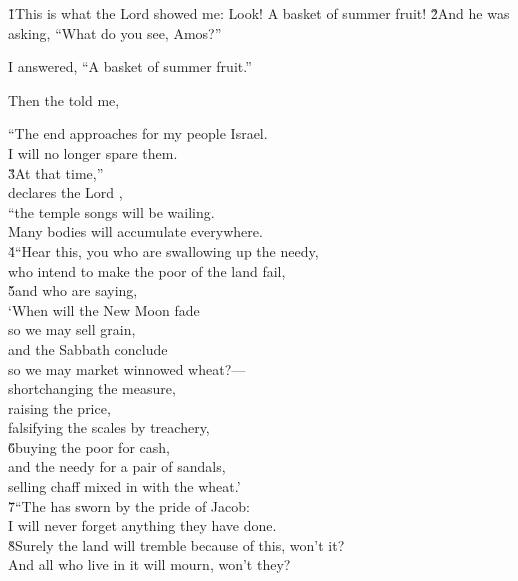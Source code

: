 \v{1}This is what the Lord  showed me: Look! A basket of summer fruit! \v{2}And he was asking, ``What do you see, Amos?''

I answered, ``A basket of summer fruit.''

Then the  told me,

\begin{poetry}
\poeml ``The end approaches for my people Israel. \\
\poemll    I will no longer spare them. \\
\poeml \v{3}At that time,'' \\
\poemll    declares the Lord , \\
\poeml ``the temple songs will be wailing. \\
\poemll    Many bodies will accumulate everywhere. \\
\poeml \v{4}``Hear this, you who are swallowing up the needy, \\
\poemll    who intend to make the poor of the land fail, \\
\poeml \v{5}and who are saying, \\
\poemll    `When will the New Moon fade \\
\poemlll       so we may sell grain, \\
\poemll    and the Sabbath conclude \\
\poemlll       so we may market winnowed wheat?--- \\
\poeml shortchanging the measure, \\
\poemll    raising the price, \\
\poemlll       falsifying the scales by treachery, \\
\poeml \v{6}buying the poor for cash, \\
\poemll    and the needy for a pair of sandals, \\
\poemlll       selling chaff mixed in with the wheat.' \\
\poeml \v{7}``The  has sworn by the pride of Jacob: \\
\poemll    I will never forget anything they have done. \\
\poeml \v{8}Surely the land will tremble because of this, won't it? \\
\poemll    And all who live in it will mourn, won't they? \\

\end{poetry}

